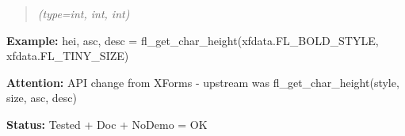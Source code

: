 \begin{boxedminipage}{\funcwidth}
\begin{quote}
      {\it (type=int, int, int)}

      \end{quote}

\textbf{Example:} hei, asc, desc = fl\_get\_char\_height(xfdata.FL\_BOLD\_STYLE, 
xfdata.FL\_TINY\_SIZE)



\textbf{Attention:} API change from XForms - upstream was fl\_get\_char\_height(style, size, 
asc, desc)



\textbf{Status:} Tested + Doc + NoDemo = OK



    \end{boxedminipage}

    \label{xformslib:flbasic:fl_get_char_width}

    \vspace{0.5ex}

